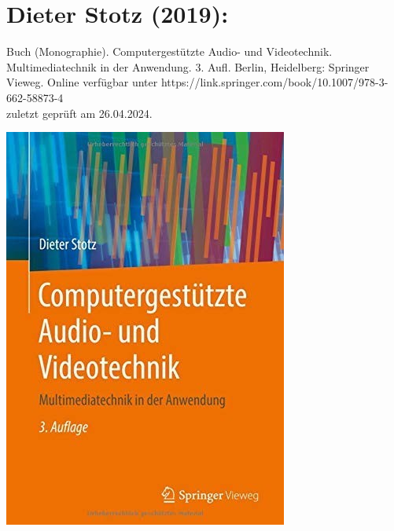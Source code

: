 \section*{Dieter Stotz (2019):}
Buch (Monographie). Computergestützte Audio- und Videotechnik. Multimediatechnik in der Anwendung. 3. Aufl. Berlin, Heidelberg: Springer Vieweg. Online verfügbar unter https://link.springer.com/book/10.1007/978-3-662-58873-4 \\zuletzt geprüft am 26.04.2024. \\
\begin{minipage}{0.5\textwidth}
	\includegraphics[width=\linewidth]{../Appendix/Literaturverzeichnis/img/Stotz.jpg}
\end{minipage}
\hfill
